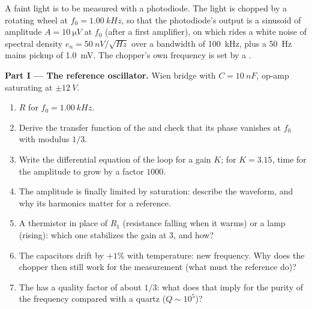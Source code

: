 \begin{problem}
\label{pb:b2:feedback-oscillators:1}

A faint light is to be measured with a photodiode. The light is chopped
by a rotating wheel at $f_0 = \qty{1.00}{kHz}$, so that the photodiode's
output is a sinusoid of amplitude $A = \qty{10}{\micro V}$ at $f_0$ (after a
first amplifier), on which rides a white noise of spectral density
$e_n = \qty{50}{nV/\sqrt{Hz}}$ over a bandwidth of \qty{100}{kHz}, plus a
\qty{50}{Hz} mains pickup of \qty{1.0}{mV}. The chopper's own frequency is
set by a .

\medskip
\noindent\textbf{Part I --- The reference oscillator.}
Wien bridge with $C = \qty{10}{nF}$, op-amp saturating at $\pm\qty{12}{V}$.
\begin{enumerate}
  \item $R$ for $f_0 = \qty{1.00}{kHz}$.
  \item Derive the transfer function of the  and check
        that its phase vanishes at $f_0$ with modulus $1/3$.
  \item Write the differential equation of the loop for a gain $K$; for
        $K = 3.15$, time for the amplitude to grow by a factor $1000$.
  \item The amplitude is finally limited by saturation: describe the
        waveform, and why its harmonics matter for a reference.
  \item A thermistor in place of $R_1$ (resistance falling when it
        warms) or a lamp (rising): which one stabilizes the gain at 3,
        and how?
  \item The capacitors drift by $+1\%$ with temperature: new frequency.
        Why does the chopper then still work for the measurement (what
        must the reference do)?
  \item The  has a quality factor of about $1/3$: what does
        that imply for the purity of the frequency compared with a
        quartz ($Q \sim 10^5$)?
\end{enumerate}


\end{problem}
